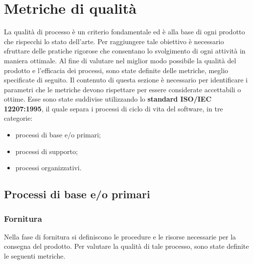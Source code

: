\section{Metriche di qualità}
La qualità di processo è un criterio fondamentale ed è alla base di ogni prodotto che rispecchi lo stato dell'arte. Per raggiungere tale obiettivo è necessario sfruttare delle pratiche rigorose che consentano lo svolgimento di ogni attività in maniera ottimale. Al fine di valutare nel miglior modo possibile la qualità del prodotto e l'efficacia dei processi, sono state definite delle metriche, meglio specificate di seguito. Il contenuto di questa sezione è necessario per identificare i parametri che le metriche devono rispettare per essere considerate accettabili o ottime. Esse sono state suddivise utilizzando lo \textbf{standard ISO/IEC 12207:1995}, il quale separa i processi di ciclo di vita del software, in tre categorie: %
\begin{itemize}
	\item processi di base e/o primari;
	\item processi di supporto;
	\item processi organizzativi.
\end{itemize}

\subsection{Processi di base e/o primari}

\subsubsection{Fornitura}
Nella fase di fornitura si definiscono le procedure e le risorse necessarie per la consegna del prodotto. Per valutare la qualità di tale processo, sono state definite le seguenti metriche.

